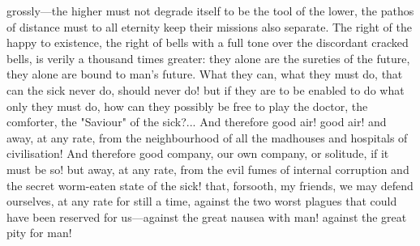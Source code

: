\documentclass[12pt]{article}
\begin{document}
grossly---the higher must not degrade itself to be the tool of the lower, the pathos of distance must to all eternity keep their missions also separate. The right of the happy to existence, the right of bells with a full tone over the discordant cracked bells, is verily a thousand times greater: they alone are the sureties of the future, they alone are bound to man's future. What they can, what they must do, that can the sick never do, should never do! but if they are to be enabled to do what only they must do, how can they possibly be free to play the doctor, the comforter, the "Saviour" of the sick?... And therefore good air! good air! and away, at any rate, from the neighbourhood of all the madhouses and hospitals of civilisation! And therefore good company, our own company, or solitude, if it must be so! but away, at any rate, from the evil fumes of internal corruption and the secret worm-eaten state of the sick! that, forsooth, my friends, we may defend ourselves, at any rate for still a time, against the two worst plagues that could have been reserved for us---against the great nausea with man! against the great pity for man!
\end{document}
